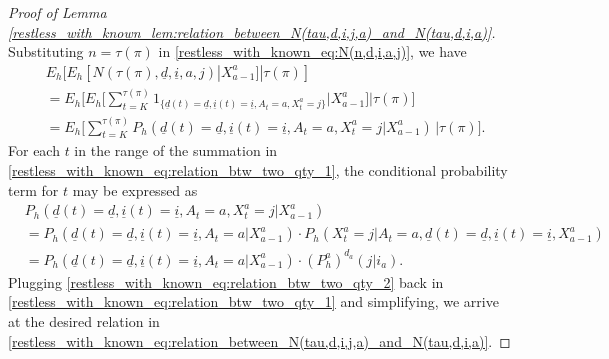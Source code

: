 \begin{proof}[Proof of Lemma \ref{restless_with_known_lem:relation_between_N(tau,d,i,j,a)_and_N(tau,d,i,a)}]
 Substituting $n=\tau(\pi)$ in \eqref{restless_with_known_eq:N(n,d,i,a,j)}, we have
 \begingroup \allowdisplaybreaks\begin{align}
 	&E_h[E_h[N(\tau(\pi),\underline{d},\underline{i},a,j)|X_{a-1}^a]|\tau(\pi)]\nonumber\\
	&=E_h\bigg[E_h\bigg[\sum\limits_{t=K}^{\tau(\pi)} 1_{\{\underline{d}(t)=\underline{d},\underline{i}(t)=\underline{i},A_{t}=a,X_{t}^a=j\}}\bigg|X_{a-1}^a\bigg]\bigg|\tau(\pi)\bigg]\nonumber\\
 	&=E_h\bigg[\sum\limits_{t=K}^{\tau(\pi)}P_h(\underline{d}(t)=\underline{d},\underline{i}(t)=\underline{i},A_{t}=a,X_{t}^a=j|X_{a-1}^a)\,\bigg|\tau(\pi)\bigg].\label{restless_with_known_eq:relation_btw_two_qty_1}
 \end{align}\endgroup
 For each $t$ in the range of the summation in \eqref{restless_with_known_eq:relation_btw_two_qty_1}, the conditional probability term for $t$ may be expressed as
 \begingroup \allowdisplaybreaks\begin{align}
 	& P_h(\underline{d}(t)=\underline{d},\underline{i}(t)=\underline{i},A_{t}=a,X_{t}^a=j|X_{a-1}^a)\nonumber\\
 	&=P_h(\underline{d}(t)=\underline{d},\underline{i}(t)=\underline{i},A_{t}=a|X_{a-1}^a)\cdot P_h(X_{t}^a=j|A_{t}=a,\underline{d}(t)=\underline{d},\underline{i}(t)=\underline{i},X_{a-1}^a)\nonumber\\
 	&=P_h(\underline{d}(t)=\underline{d},\underline{i}(t)=\underline{i},A_{t}=a|X_{a-1}^a)\cdot (P_h^a)^{d_a}(j|i_a).\label{restless_with_known_eq:relation_btw_two_qty_2}
 \end{align}\endgroup
 Plugging \eqref{restless_with_known_eq:relation_btw_two_qty_2} back in \eqref{restless_with_known_eq:relation_btw_two_qty_1} and simplifying, we arrive at the desired relation in \eqref{restless_with_known_eq:relation_between_N(tau,d,i,j,a)_and_N(tau,d,i,a)}.
\end{proof}

